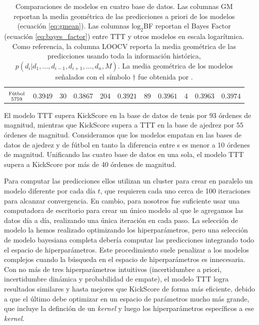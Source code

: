 \documentclass[a4paper,11pt]{book}
\newcommand\hfrac[2]{\genfrac{}{}{0pt}{}{#1}{#2}} %
\theoremstyle{definition}
\newif\ifen
\newcommand{\en}[1]{\ifen#1\fi}
\begin{document}
\begin{table}[ht!]
\begin{tabular}{c|cc|cc|cc|cc|c||c}
 & & & & & & & & & \\
 \multirow{2}{*}{$\hfrac{\text{\scriptsize \en{Football}F\'utbol}}{\num{5759}}$} & \multirow{2}{*}{$0.3949$} & \multirow{2}{*}{\num{30}} & \multirow{2}{*}{$0.3867$} & \multirow{2}{*}{\num{204}} & \multirow{2}{*}{$0.3921$} & \multirow{2}{*}{\num{89}} & \multirow{2}{*}{$\bm{0.3961}$} & \multirow{2}{*}{\num{4}} & \multirow{2}{*}{$\bm{0.3963}$} &  \multirow{2}{*}{${0.3974}$} \\
  & & & & & & & & & & \\ \hline
  \end{tabular}
  \caption{
  Comparaciones de modelos en cuatro base de datos.
  Las columnas GM reportan la media geométrica de las predicciones a priori de los modelos (ecuaci\'on \ref{eq:gmean}).
  Las columnas $\text{log}_2$BF reportan el Bayes Factor (ecuaci\'on \ref{eq:bayes_factor}) entre TTT y otros modelos en escala logarítmica.
  Como referencia, la columna LOOCV reporta la media geométrica de las predicciones usando toda la informaci\'on hist\'orica, $p(d_i| d_1, \dots, d_{i-1}, d_{i+1}, \dots, d_n , M)$.
  La media geométrica de los modelos señalados con el símbolo $\dagger$ fue obtenida por \cite{Maystre2019}.
  }
  \label{Tab:Models}
\end{table}
%
El modelo TTT supera KickScore en la base de datos de tenis por $93$ \'ordenes de magnitud, mientras que KickScore supera a TTT en la base de ajedrez por $55$ \'ordenes de magnitud.
%
Consideramos que los modelos empatan en las bases de datos de ajedrez y de fútbol en tanto la diferencia entre s es menor a 10 \'ordenes de magnitud.
%
Unificando las cuatro base de datos en una sola, el modelo TTT supera a KickScore por más de 40 \'ordenes de magnitud.

Para computar las predicciones ellos utilizan un cluster para crear en paralelo un modelo diferente por cada día $t$, que requieren cada uno cerca de 100 iteraciones para alcanzar convergencia.
%
En cambio, para nosotros fue suficiente usar una computadora de escritorio para crear un \'unico modelo al que le agregamos las datos día a día, realizando una \'unica iteraci\'on en cada paso.
%
La selecci\'on de modelo la hemos realizado optimizando los hiperparámetros, pero una selecci\'on de modelo bayesiana completa debería computar las predicciones integrando todo el espacio de hiperparámetros.
%
Este procedimiento suele penalizar a los modelos complejos cuando la b\'usqueda en el espacio de hiperparámetros es innecesaria.
%
Con no más de tres hiperparámetros intuitivos (incertidumbre a priori, incertidumbre dinámica y probabilidad de empate), el modelo TTT logra resultados similares y hasta mejores que KickScore de forma más eficiente, debido a que el \'ultimo debe optimizar en un espacio de parámetros mucho más grande, que incluye la definci\'on de un \emph{kernel} y luego los hiperparámetros específicos a ese \emph{kernel}.
\end{document}
